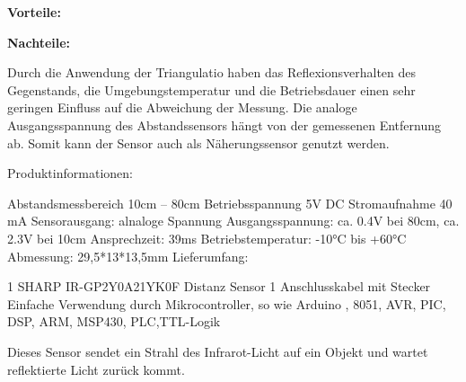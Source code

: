 \par\bigskip %
\textbf{Vorteile:}  %

\par\bigskip %
\textbf{Nachteile:}  %

Durch die Anwendung der Triangulatio haben das Reflexionsverhalten des Gegenstands, die Umgebungstemperatur und die Betriebsdauer einen sehr geringen Einfluss auf die Abweichung der Messung. Die analoge Ausgangsspannung des Abstandssensors hängt von der gemessenen Entfernung ab. Somit kann der Sensor auch als Näherungssensor genutzt werden.

Produktinformationen:

Abstandsmessbereich 10cm – 80cm
Betriebsspannung 5V DC
Stromaufnahme 40 mA
Sensorausgang: alnaloge Spannung
Ausgangsspannung: ca. 0.4V bei 80cm, ca. 2.3V bei 10cm
Ansprechzeit: 39ms
Betriebstemperatur: -10°C bis +60°C
Abmessung: 29,5*13*13,5mm
Lieferumfang:

1 SHARP IR-GP2Y0A21YK0F Distanz Sensor
1 Anschlusskabel mit Stecker
Einfache Verwendung durch Mikrocontroller, so wie Arduino , 8051, AVR, PIC, DSP, ARM, MSP430, PLC,TTL-Logik


Dieses Sensor sendet ein Strahl des Infrarot-Licht auf ein Objekt und wartet  reflektierte Licht zurück kommt.